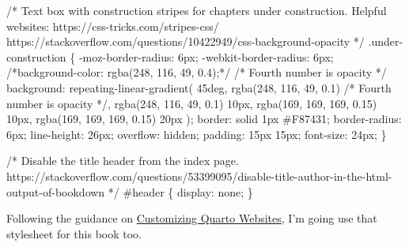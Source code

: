 \documentclass[
  letterpaper,
  DIV=11,
  numbers=noendperiod]{scrreprt}
\newenvironment{Shaded}{\begin{snugshade}}{\end{snugshade}}
\newcommand{\InformationTok}[1]{\textcolor[rgb]{0.37,0.37,0.37}{#1}}
\begin{document}
\begin{Shaded}
\begin{Highlighting}[]
\InformationTok{/* }
\InformationTok{Text box with construction stripes for chapters under construction.}
\InformationTok{Helpful websites: }
\InformationTok{https://css{-}tricks.com/stripes{-}css/}
\InformationTok{https://stackoverflow.com/questions/10422949/css{-}background{-}opacity}
\InformationTok{*/}
\InformationTok{.under{-}construction \{}
\InformationTok{  {-}moz{-}border{-}radius: 6px;}
\InformationTok{  {-}webkit{-}border{-}radius: 6px;}
\InformationTok{  /*background{-}color: rgba(248, 116, 49, 0.4);*/ /* Fourth number is opacity */}
\InformationTok{  background: repeating{-}linear{-}gradient(}
\InformationTok{    45deg,}
\InformationTok{    rgba(248, 116, 49, 0.1) /* Fourth number is opacity */,}
\InformationTok{    rgba(248, 116, 49, 0.1) 10px,}
\InformationTok{    rgba(169, 169, 169, 0.15) 10px,}
\InformationTok{    rgba(169, 169, 169, 0.15) 20px}
\InformationTok{  );}
\InformationTok{  border: solid 1px \#F87431;}
\InformationTok{  border{-}radius: 6px;}
\InformationTok{  line{-}height: 26px;}
\InformationTok{  overflow: hidden;}
\InformationTok{  padding: 15px 15px;}
\InformationTok{  font{-}size: 24px;}
\InformationTok{\}}


\InformationTok{/*}
\InformationTok{Disable the title header from the index page.}
\InformationTok{https://stackoverflow.com/questions/53399095/disable{-}title{-}author{-}in{-}the{-}html{-}output{-}of{-}bookdown}
\InformationTok{*/}
\InformationTok{\#header \{}
\InformationTok{    display: none;}
\InformationTok{\}}

\InformationTok{\textasciigrave{}\textasciigrave{}\textasciigrave{}}
\end{Highlighting}
\end{Shaded}

Following the guidance on
\href{https://ucsb-meds.github.io/customizing-quarto-websites/\#/title-slide}{Customizing
Quarto Websites}, I'm going use that stylesheet for this book too.
\end{document}
